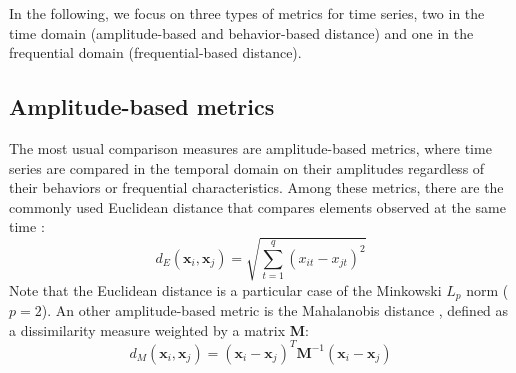 In the following, we focus on three types of metrics for time series, two in the time domain (amplitude-based and behavior-based distance) and one in the frequential domain (frequential-based distance).






\subsection{Amplitude-based metrics}
\label{sec:TSmetrics}

The most usual comparison measures are amplitude-based metrics, where time series are compared in the temporal domain on their amplitudes regardless of their behaviors or frequential characteristics. Among these metrics, there are the commonly used Euclidean distance that compares elements observed at the same time \cite{Ding2008}: 
\begin{equation}	
	d_E(\textbf{x}_i,\textbf{x}_j) = \sqrt{\sum\limits_{t=1}^{q} (x_{it}-x_{jt})^2}
\label{eq:A}
\end{equation}
Note that the Euclidean distance is a particular case of the Minkowski $L_p$ norm ($p=2$). An other amplitude-based metric is the Mahalanobis distance \cite{Prekopcsak2012}, defined as a dissimilarity measure weighted by a matrix \textbf{M}:
\begin{equation}	
	d_M(\textbf{x}_i,\textbf{x}_j) = (\textbf{x}_i-\textbf{x}_j)^T\textbf{M}^{-1}(\textbf{x}_i-\textbf{x}_j)
	\label{eq:dM}
\end{equation}

